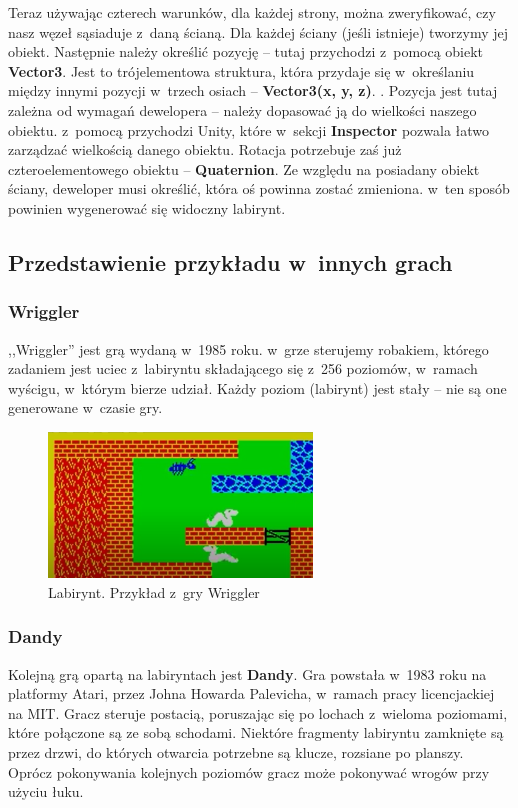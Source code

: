 \documentclass[oneside,polski,logo]{amuthesis}
\begin{document}
Teraz używając czterech warunków, dla każdej strony, można zweryfikować, czy nasz węzeł sąsiaduje z~daną ścianą. Dla każdej ściany (jeśli istnieje) tworzymy jej obiekt. Następnie należy określić pozycję – tutaj przychodzi z~pomocą obiekt \textbf{Vector3}. Jest to trójelementowa struktura, która przydaje się w~określaniu między innymi pozycji w~trzech osiach – \textbf{Vector3(x, y, z)}. \cite{Vector3}. Pozycja jest tutaj zależna od wymagań dewelopera – należy dopasować ją do wielkości naszego obiektu. z~pomocą przychodzi Unity, które w~sekcji \textbf{Inspector} pozwala łatwo zarządzać wielkością danego obiektu. Rotacja potrzebuje zaś już czteroelementowego obiektu – \textbf{Quaternion}. Ze względu na posiadany obiekt ściany, deweloper musi określić, która oś powinna zostać zmieniona. w~ten sposób powinien wygenerować się widoczny labirynt.

\subsection{Przedstawienie przykładu w~innych grach}
\subsubsection{Wriggler}
\par ,,Wriggler'' jest grą wydaną w~1985 roku. w~grze sterujemy robakiem, którego zadaniem jest uciec z~labiryntu składającego się z~256 poziomów, w~ramach wyścigu, w~którym bierze udział. Każdy poziom (labirynt) jest stały – nie są one generowane w~czasie gry.  \cite{Wriggler}


\begin{figure}[h!]
	\centering
	\includegraphics[width=7cm]{images/tyrek/wriggler.png}
	\caption{Labirynt. Przykład z~gry Wriggler}
\end{figure}

\subsubsection{Dandy}
\par Kolejną grą opartą na labiryntach jest \textbf{Dandy}. Gra powstała w~1983 roku na platformy Atari, przez Johna Howarda Palevicha, w~ramach pracy licencjackiej na MIT. Gracz steruje postacią, poruszając się po lochach z~wieloma poziomami, które połączone są ze sobą schodami. Niektóre fragmenty labiryntu zamknięte są przez drzwi, do których otwarcia potrzebne są klucze, rozsiane po planszy. Oprócz pokonywania kolejnych poziomów gracz może pokonywać wrogów przy użyciu łuku. \cite{Dandy}
\clearpage
\end{document}
